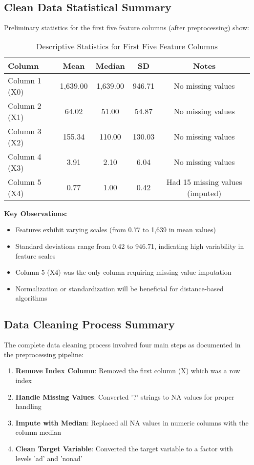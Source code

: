 \subsection{Clean Data Statistical Summary}
Preliminary statistics for the first five feature columns (after preprocessing) show:

\begin{table}[h]
\centering
\caption{Descriptive Statistics for First Five Feature Columns}
\label{tab:basic_stats}
\begin{tabular}{|l|c|c|c|c|}
\hline
\textbf{Column} & \textbf{Mean} & \textbf{Median} & \textbf{SD} & \textbf{Notes} \\
\hline
Column 1 (X0) & 1,639.00 & 1,639.00 & 946.71 & No missing values \\
Column 2 (X1) & 64.02 & 51.00 & 54.87 & No missing values \\
Column 3 (X2) & 155.34 & 110.00 & 130.03 & No missing values \\
Column 4 (X3) & 3.91 & 2.10 & 6.04 & No missing values \\
Column 5 (X4) & 0.77 & 1.00 & 0.42 & Had 15 missing values (imputed) \\
\hline
\end{tabular}
\end{table}

\textbf{Key Observations:}
\begin{itemize}
    \item Features exhibit varying scales (from 0.77 to 1,639 in mean values)
    \item Standard deviations range from 0.42 to 946.71, indicating high variability in feature scales
    \item Column 5 (X4) was the only column requiring missing value imputation
    \item Normalization or standardization will be beneficial for distance-based algorithms
\end{itemize}

\subsection{Data Cleaning Process Summary}
The complete data cleaning process involved four main steps as documented in the preprocessing pipeline:

\begin{enumerate}
    \item \textbf{Remove Index Column}: Removed the first column (X) which was a row index
    \item \textbf{Handle Missing Values}: Converted '?' strings to NA values for proper handling
    \item \textbf{Impute with Median}: Replaced all NA values in numeric columns with the column median
    \item \textbf{Clean Target Variable}: Converted the target variable to a factor with levels 'ad' and 'nonad'
\end{enumerate}

